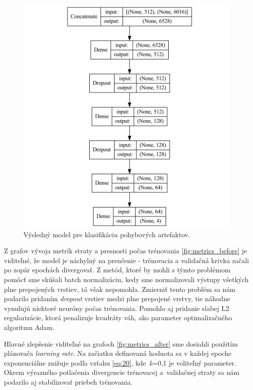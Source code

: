 \begin{figure}[H]
    \centering    
    \includegraphics[scale=0.075]{img/artefact_classification_model.jpg}
    \caption{Výsledný model pre klasifikáciu pohybových artefaktov.}
    \label{fig:artefact_classification_model}
\end{figure}

Z grafov vývoja metrík straty a presnosti počas trénovania \ref{fig:metrics_before} je viditeľné, že model je náchylný na preučenie - trénovacia a validačná krivka začali po zopár epochách divergovať. Z metód, ktoré by mohli s týmto problémom pomôcť sme skúšali batch normalizáciu, kedy sme normalizovali výstupy všetkých plne prepojených vrstiev, tá však nepomohla. Zmierniť tento problém sa nám podarilo pridaním \textit{dropout} vrstiev medzi plne prepojené vrstvy, tie náhodne vynulujú niektoré neuróny počas trénovania. Pomohlo aj pridanie slabej L2 regularizácie, ktorá penalizuje kvadráty váh, ako parameter optimalizačného algoritmu Adam.

Hlavné zlepšenie viditeľné na grafoch \ref{fig:metrics_after} sme dosiahli použitím plánovača \textit{learning rate}. Na začiatku definovaná hodnota sa v každej epoche exponenciálne znižuje podľa vzťahu \ref{eq:20}, kde~\textit{k}=0,1 je voliteľný parameter. Okrem výrazného potlačenia divergencie trénovacej a~validačnej straty sa nám podarilo aj stabilizovať priebeh trénovania.

